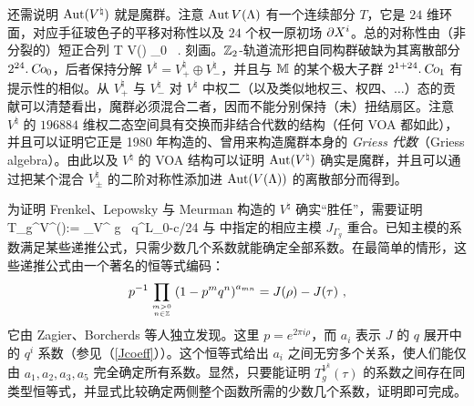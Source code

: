 
还需说明 $\operatorname{\text{Aut}}(V^\natural)$ 就是魔群。注意 $\operatorname{\text{Aut}} V(\Lambda)$ 有一个连续部分 $T$，它是 $24$ 维环面，对应手征玻色子的平移对称性以及 $24$ 个权一原初场 $\partial X^i$。总的对称性由（非分裂的）短正合列
 \rightarrow T V(\Lambda) \rightarrow \Co_0 ~. 
\ee 
刻画。$\mathbb{Z}_2$-轨道流形把自同构群破缺为其离散部分 $2^{24}.\operatorname{\textsl{Co}}_0$，后者保持分解 $V^\natural=V^\natural_+\oplus V^\natural_-$，并且与 $\mathbb{M}$ 的某个极大子群 $2^{1+24}.\operatorname{\textsl{Co}}_1$ 有提示性的相似。从 $V^\natural_+$ 与 $V^\natural_-$ 对 $V^\natural$ 中权二（以及类似地权三、权四、$\dots$）态的贡献可以清楚看出，魔群必须混合二者，因而不能分别保持（未）扭结扇区。注意 $V^\natural$ 的 $196884$ 维权二态空间具有交换而非结合代数的结构（任何 VOA 都如此），并且可以证明它正是 1980 年构造的、曾用来构造魔群本身的 \emph{Griess 代数}（Griess algebra）\cite{Gri_FG}。由此以及 $V^\natural$ 的 VOA 结构可以证明 $\operatorname{\text{Aut}}(V^\natural)$ 确实是魔群，并且可以通过把某个混合 $V^\natural_\pm$ 的二阶对称性添加进 $\operatorname{\text{Aut}}(V(\Lambda))$ 的离散部分而得到。


为证明 Frenkel、Lepowsky 与 Meurman 构造的 $V^\natural$ 确实“胜任”，需要证明
\be
T_g^{V^\natural}(\tau):= \tr_{V^\natural} g \, q^{L_0-c/24} 
\ee
与 \cite{conway_norton} 中指定的相应主模 $J_{\Gamma_g}$ 重合。已知主模的系数满足某些递推公式，只需少数几个系数就能确定全部系数。在最简单的情形，这些递推公式由一个著名的恒等式编码：
\begin{equation}
\label{eq:replicability_J}
p^{-1}\prod_{m>0\atop n\in\mathbb{Z}}\left(1-p^mq^n\right)^{a_{mn}}=J(\rho)-J(\tau)~,
\end{equation}
它由 Zagier、Borcherds 等人独立发现。这里 $p=e^{2\pi i\rho}$，而 $a_i$ 表示 $J$ 的 $q$ 展开中的 $q^i$ 系数（参见（\ref{Jcoeff}））。这个恒等式给出 $a_i$ 之间无穷多个关系，使人们能仅由 $a_1,a_2,a_3,a_5$ 完全确定所有系数。显然，只要能证明 $T_g^{V^\natural}(\tau)$ 的系数之间存在同类型恒等式，并显式比较确定两侧整个函数所需的少数几个系数，证明即可完成。

